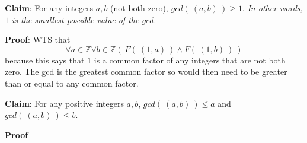 
{\bf Claim}: For any integers $a,b$ (not both zero), $gcd(~(a,b)~) \geq 1$.
{\it In other words, $1$ is the smallest possible value of the $gcd$}.

{\bf Proof}: WTS that 
\[
    \forall a \in \mathbb{Z} \forall b \in \mathbb{Z} \left(
    ~F(~(1,a)~) \land F(~(1,b)~)~ \right)
\]
because this says that $1$ is a common factor of any integers that are not both zero. The gcd 
is the greatest common factor so would then need to be greater than or equal to any common factor.

\vspace{250pt}

{\bf Claim}: For any positive integers $a,b$, $gcd(~(a,b)~) \leq a$ and $gcd( ~(a,b)~) \leq b$.

{\bf Proof} \phantom{Using the definition of gcd and the fact that factors of a positive integers
are less then or equal to that integer.}

\vspace{50pt}